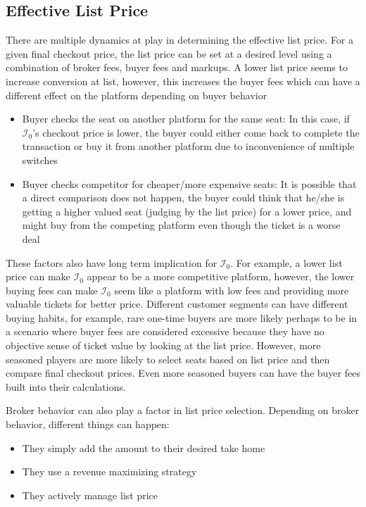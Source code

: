 \documentclass[letterpaper, 12pt]{article}
\begin{document}
\subsection{Effective List Price}
	There are multiple dynamics at play in determining the effective list price. For a given final checkout price, the list price can be set at a desired level using a combination of broker fees, buyer fees and markups. A lower list price seems to increase conversion at list, however, this increases the buyer fees which can have a different effect on the platform depending on buyer behavior
	\begin{itemize}
		\item Buyer checks the seat on another platform for the same seat: In this case, if $\mathcal{I}_0$'s checkout price is lower, the buyer could either come back to complete the transaction or buy it from another platform due to inconvenience of multiple switches
		\item Buyer checks competitor for cheaper/more expensive seats: It is possible that a direct comparison does not happen, the buyer could think that he/she is getting a higher valued seat (judging by the list price) for a lower price, and might buy from the competing platform even though the ticket is a worse deal
	\end{itemize}
	These factors also have long term implication for $\mathcal{I}_0$. For example, a lower list price can make $\mathcal{I}_0$ appear to be a more competitive platform, however, the lower buying fees can make $\mathcal{I}_0$ seem like a platform with low fees and providing more valuable tickets for better price. Different customer segments can have different buying habits, for example, rare one-time buyers are more likely perhaps to be in a scenario where buyer fees are considered excessive because they have no objective sense of ticket value by looking at the list price. However, more seasoned players are more likely to select seats based on list price and then compare final checkout prices. Even more seasoned buyers can have the buyer fees built into their calculations. 

	Broker behavior can also play a factor in list price selection. Depending on broker behavior, different things can happen:
	\begin{itemize}
		\item They simply add the amount to their desired take home
		\item They use a revenue maximizing strategy
		\item They actively manage list price
	\end{itemize}
\end{document}

